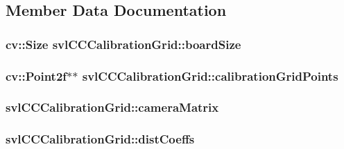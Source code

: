 \subsection{Member Data Documentation}
\hypertarget{classsvl_c_c_calibration_grid_a0c584283648c8d63a0c33646d35a60f2}{
\subsubsection[{board\-Size}]{\setlength{\rightskip}{0pt plus 5cm}cv\-::\-Size svl\-C\-C\-Calibration\-Grid\-::board\-Size}}\label{classsvl_c_c_calibration_grid_a0c584283648c8d63a0c33646d35a60f2}
\hypertarget{classsvl_c_c_calibration_grid_a16c87e7174d1ebadad02bb2f00374f20}{
\subsubsection[{calibration\-Grid\-Points}]{\setlength{\rightskip}{0pt plus 5cm}cv\-::\-Point2f$\ast$$\ast$ svl\-C\-C\-Calibration\-Grid\-::calibration\-Grid\-Points}}\label{classsvl_c_c_calibration_grid_a16c87e7174d1ebadad02bb2f00374f20}
\hypertarget{classsvl_c_c_calibration_grid_a7a2116179fd17b6225c5fbeab19d99a0}{
\subsubsection[{camera\-Matrix}]{ svl\-C\-C\-Calibration\-Grid\-::camera\-Matrix}}\label{classsvl_c_c_calibration_grid_a7a2116179fd17b6225c5fbeab19d99a0}
\hypertarget{classsvl_c_c_calibration_grid_a24635710953d9ad967caed593db745cf}{
\subsubsection[{dist\-Coeffs}]{ svl\-C\-C\-Calibration\-Grid\-::dist\-Coeffs}}\label{classsvl_c_c_calibration_grid_a24635710953d9ad967caed593db745cf}
